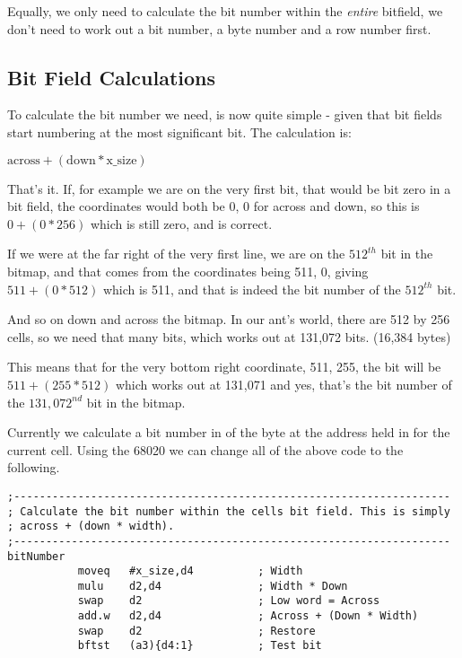 Equally, we only need to calculate the bit number within the \emph{entire} bitfield, we don't need to work out a bit number, a byte number and a row number first.

\subsection{Bit Field Calculations}

To calculate the bit number we need, is now quite simple - given that bit fields start numbering at the most significant bit. The calculation is:

$\text{across} + (\text{down} * \text{x\_size})$

That's it. If, for example we are on the very first bit, that would be bit zero in a bit field, the coordinates would both be 0, 0 for across and down, so this is $0 + (0 * 256)$ which is still zero, and is correct.

If we were at the far right of the very first line, we are on the $512^{th}$ bit in the bitmap, and that comes from the coordinates being 511, 0, giving $511 + (0 * 512)$ which is 511, and that is indeed the bit number of the $512^{th}$ bit.

And so on down and across the bitmap. In our ant's world, there are 512 by 256 cells, so we need that many bits, which works out at 131,072 bits. (16,384 bytes) 

This means that for the very bottom right coordinate, 511, 255, the bit will be $511 + (255 * 512)$ which works out at 131,071 and yes, that's the bit number of the $131,072^{nd}$ bit in the bitmap.

Currently we calculate a bit number in  of the byte at the address held in  for the current cell. Using the 68020 we can change all of the above code to the following.

\begin{lstlisting}[firstnumber=255,caption={Langtons Ant - 68020 Bitmap Calculation}]
;--------------------------------------------------------------------
; Calculate the bit number within the cells bit field. This is simply
; across + (down * width).
;--------------------------------------------------------------------
bitNumber
           moveq   #x_size,d4          ; Width
           mulu    d2,d4               ; Width * Down
           swap    d2                  ; Low word = Across
           add.w   d2,d4               ; Across + (Down * Width)
           swap    d2                  ; Restore
           bftst   (a3){d4:1}          ; Test bit
\end{lstlisting}

